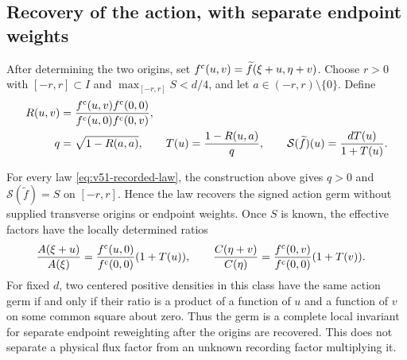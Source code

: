 \subsection{Recovery of the action, with separate endpoint weights}

After determining the two origins, set
$f^{\rm c}(u,v)=\widetilde f(\xi+u,\eta+v)$.  Choose $r>0$ with
$[-r,r]\subset I$ and $\max_{[-r,r]}S<d/4$, and let
$a\in(-r,r)\setminus\{0\}$.  Define
\begin{align}
 R(u,v)&=\frac{f^{\rm c}(u,v)f^{\rm c}(0,0)}
                   {f^{\rm c}(u,0)f^{\rm c}(0,v)},
                      \label{eq:v51-centered-ratio}\\
 q&=\sqrt{1-R(a,a)},\qquad
 T(u)=\frac{1-R(u,a)}{q},\qquad
 \mathcal S(\widetilde f)(u)=\frac{dT(u)}{1+T(u)}.
                      \label{eq:v51-centered-inverse}
\end{align}

\begin{theorem}
\label{thm:v51-action}
For every law \eqref{eq:v51-recorded-law}, the construction above gives
$q>0$ and $\mathcal S(\widetilde f)=S$ on $[-r,r]$.  Hence the law
recovers the signed action germ without supplied transverse origins or
endpoint weights.  Once $S$ is known, the effective factors have the
locally determined ratios
\begin{align}
 \frac{A(\xi+u)}{A(\xi)}
   &=\frac{f^{\rm c}(u,0)}{f^{\rm c}(0,0)}(1+T(u)),
 \qquad
 \frac{C(\eta+v)}{C(\eta)}
   =\frac{f^{\rm c}(0,v)}{f^{\rm c}(0,0)}(1+T(v)).
                         \label{eq:v51-effective-weights}
\end{align}
For fixed $d$, two centered positive densities in this class have the same
action germ if and only if their ratio is a product of a function of $u$
and a function of $v$ on some common square about zero.  Thus the germ is
a complete local invariant for separate endpoint reweighting after the
origins are recovered.  This does not separate a physical flux factor
from an unknown recording factor multiplying it.
\end{theorem}

